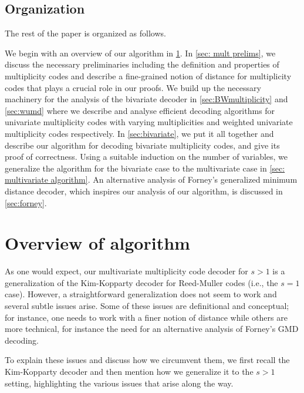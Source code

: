 \documentclass{article}
\begin{document}
	\subsection{Organization}
	The rest of the paper is organized as follows. 
	
	We begin with an overview of our algorithm in \cref{sec: overview}. In \cref{sec: mult prelims}, we discuss the necessary preliminaries including the definition and properties of multiplicity codes and describe  a fine-grained notion of distance for multiplicity codes that plays a crucial role in our proofs. We build up the necessary machinery for the analysis of the bivariate decoder in \cref{sec:BWmultiplicity} and \cref{sec:wumd} where we describe and analyse efficient decoding algorithms for univariate multiplicity codes with varying multiplicities and weighted univariate multiplicity codes respectively. In \cref{sec:bivariate}, we put it all together and describe our algorithm for decoding bivariate multiplicity codes, and give its proof of correctness. Using a suitable induction on the number of variables, we generalize the algorithm for the bivariate case to the multivariate case in \cref{sec: multivariate algorithm}. An alternative analysis of Forney's generalized minimum distance decoder, which inspires our analysis of our algorithm, is discussed in \cref{sec:forney}.
	
	
	\section{Overview of algorithm}\label{sec: overview}
	
	As one would expect, our multivariate multiplicity code decoder for
	$s> 1$ is a generalization of the Kim-Kopparty decoder for
	Reed-Muller codes (i.e., the $s=1$ case). However, a straightforward
	generalization does not seem to work and several subtle issues
	arise. Some of these issues are definitional and conceptual; for
	instance, one needs to work with a finer notion of distance while
	others are more technical, for instance the need for an alternative analysis of
	Forney's GMD decoding.
	
	
	To explain these issues and discuss how we circumvent them, we first recall
	the Kim-Kopparty decoder and then mention how we generalize it to
	the $s > 1$ setting, highlighting the various issues that arise along
	the way.
	
\end{document}

